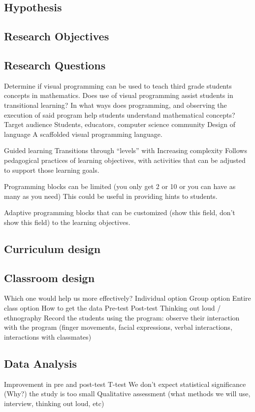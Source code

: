 \documentclass[12pt]{article}
\begin{document}
\subsection*{Hypothesis}
\subsection*{Research Objectives}
\subsection*{Research Questions}

Determine if visual programming can be used to teach third grade students concepts in mathematics.
Does use of visual programming assist students in transitional learning?
In what ways does programming, and observing the execution of said program help students understand mathematical concepts?
Target audience
Students, educators, computer science community
Design of language
A scaffolded visual programming language.

Guided learning
Transitions through “levels” with Increasing complexity
Follows pedagogical practices of learning objectives,  with activities that can be adjusted to support those learning goals.

Programming blocks can be limited (you only get 2 or 10 or you can have as many as you need) This could be useful in providing hints to students.

Adaptive programming blocks that can be customized (show this field, don’t show this field) to the learning objectives.

\subsection*{Curriculum design}
\subsection*{Classroom design}
Which one would help us more effectively?
Individual option
Group option
Entire class option
How to get the data
	Pre-test
	Post-test
	Thinking out loud / ethnography
		Record the students using the program: observe their interaction with the program (finger movements, facial expressions, verbal interactions, interactions with classmates)
\subsection*{Data Analysis}
Improvement in pre and post-test
T-test
We don’t expect statistical significance (Why?) the study is too small 
Qualitative assessment (what methods we will use, interview, thinking out loud, etc)
\end{document}
